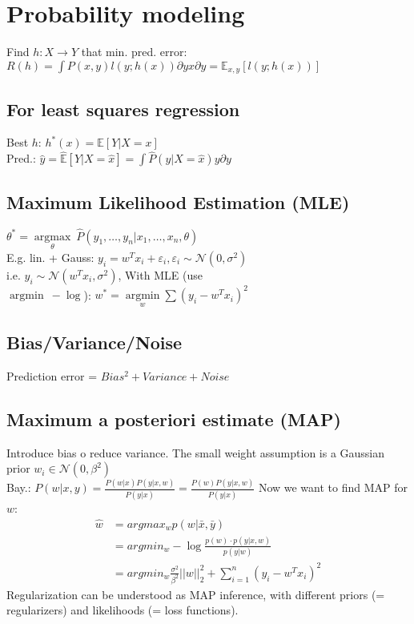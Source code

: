 \section*{Probability modeling}
Find $h:X\rightarrow Y$ that min. pred. error: 
$R(h) = \int P(x,y)l(y;h(x)) \partial yx \partial y = \mathbb{E}_{x,y}[l(y;h(x))]$

\subsection*{For least squares regression}
Best $h$: $h^*(x) = \mathbb{E}[Y|X=x]$ \\
Pred.: $\hat{y} = \hat{\mathbb{E}}[Y|X=\hat{x}] = \int \hat{P}(y|X=\hat{x}) y \partial y$

\subsection*{Maximum Likelihood Estimation (MLE)}
$\theta^* = \underset{\theta}{\operatorname{argmax}} ~ \hat{P}(y_1,\ldots,y_n|x_1,\ldots,x_n,\theta)$\\
E.g. lin. + Gauss: $y_i = w^T x_i + \varepsilon_i, \varepsilon_i \sim \mathcal{N}(0, \sigma^2)$\\
i.e. $y_i \sim \mathcal{N}(w^T x_i, \sigma^2)$, With MLE (use\\ $\operatorname{argmin} ~ - \operatorname{log}$): $w^* = \underset{w}{\operatorname{argmin}} \sum (y_i-w^{T}x_i)^2$

\subsection*{Bias/Variance/Noise}
Prediction error = $Bias^2 + Variance + Noise$

\subsection*{Maximum a posteriori estimate (MAP)}
Introduce bias o reduce variance. The small weight assumption is a Gaussian prior $w_i \in \mathcal{N}(0, \beta^2)$\\
Bay.: $P(w|x,y) = \frac{P(w|x) P(y|x,w)}{P(y|x)} = \frac{P(w) P(y|x,w)}{P(y|x)}$
Now we want to find MAP for $w$:
\begin{align*}
    \hat{w} &= argmax_w p(w | \bar{x}, \bar{y})\\
    &= argmin_w - \log{\frac{p(w) \cdot p(y | x, w)}{p(y|w)}} \\
    &= argmin_w \frac{\sigma^2}{\beta^2} ||w||^2_2 + \sum_{i=1}^n {(y_i - w^T x_i)}^2
\end{align*}
Regularization can be understood as MAP inference, with different priors (= regularizers) and likelihoods (= loss functions).

